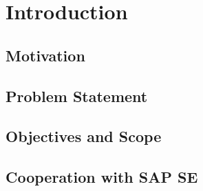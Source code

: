 \chapter{Introduction}

\section{Motivation}

\section{Problem Statement}

\section{Objectives and Scope}

\section{Cooperation with SAP SE}
